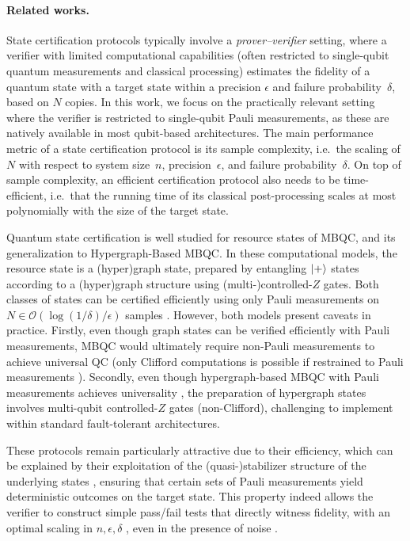 \documentclass[a4paper,twocolumn,11pt,unpublished]{quantumarticle}
\begin{document}
\paragraph{Related works.}
State certification protocols typically involve a \emph{prover--verifier} setting, where a verifier with limited computational capabilities (often restricted to single-qubit quantum measurements and classical processing) estimates the fidelity of a quantum state with a target state within a precision $\epsilon$ and failure probability~$\delta$, based on $N$ copies.
In this work, we focus on the practically relevant setting where the verifier is restricted to single-qubit Pauli measurements, as these are natively available in most qubit-based architectures.
The main performance metric of a state certification protocol is its sample complexity, i.e.\ the scaling of $N$ with respect to system size~$n$, precision~$\epsilon$, and failure probability~$\delta$. On top of sample complexity, an efficient certification protocol also needs to be time-efficient, i.e.\ that the running time of its classical post-processing scales at most polynomially with the size of the target state.

Quantum state certification is well studied for resource states of MBQC, and its generalization to Hypergraph-Based MBQC.
In these computational models, the resource state is a (hyper)graph state, prepared by entangling $\ket{+}$ states according to a (hyper)graph structure using (multi-)controlled-$Z$ gates.
Both classes of states can be certified efficiently using only Pauli measurements on $N \in \mathcal{O}(\log(1/\delta)/\epsilon)$ samples \cite{ZH18efficient}.
However, both models present caveats in practice. Firstly, even though graph states can be verified efficiently with Pauli measurements, MBQC would ultimately require non-Pauli measurements to achieve universal QC (only Clifford computations is possible if restrained to Pauli measurements \cite{DKP07measurement}).  Secondly, even though hypergraph-based MBQC with Pauli measurements achieves universality \cite{TMH18quantum}, the preparation of hypergraph states involves multi-qubit controlled-$Z$ gates (non-Clifford), challenging to implement within standard fault-tolerant architectures.

These protocols remain particularly attractive due to their efficiency, which can be explained by their exploitation of the (quasi-)stabilizer structure of the underlying states \cite{ZH19efficient}, ensuring that certain sets of Pauli measurements yield deterministic outcomes on the target state.
This property indeed allows the verifier to construct simple pass/fail tests that directly witness fidelity, with an optimal scaling in $n, \epsilon, \delta$ \cite{ZH19efficient}, even in the presence of noise \cite{LZH23robust}.
\end{document}
